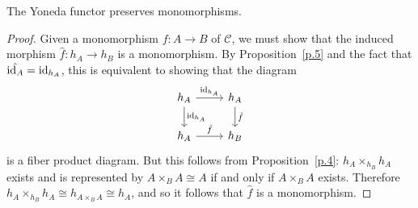 \documentclass[dissertation.tex]{subfiles}
\begin{document}
\begin{cor}
  The Yoneda functor preserves monomorphisms.

  \begin{proof}
    Given a monomorphism $f \colon A \rightarrow B$ of $\mathscr{C}$, we must show that the induced morphism $\hat{f} \colon h_A \rightarrow h_B$ is a monomorphism.
    By Proposition~\ref{p.5} and the fact that $\hat{\operatorname{id}_A} = \operatorname{id}_{h_A}$, this is equivalent to showing that the diagram
    $$\begin{tikzcd}
      h_A \arrow{d}{\op{id}_{h_A}}\arrow{r}{\op{id}_{h_A}} & h_A\arrow{d}{\hat{f}}\\
    h_A \arrow{r}{\hat{f}} & h_B
  \end{tikzcd}$$
    is a fiber product diagram.
    But this follows from Proposition~\ref{p.4}: $h_A \times_{h_B} h_A$ exists and is represented by $A \times_B A \cong A$ if and only if $A \times_B A$ exists.
    Therefore $h_A \times_{h_B} h_A \cong h_{A \times_B A} \cong h_A$, and so it follows that $\hat{f}$ is a monomorphism.
  \end{proof}
\end{cor}
\end{document}
